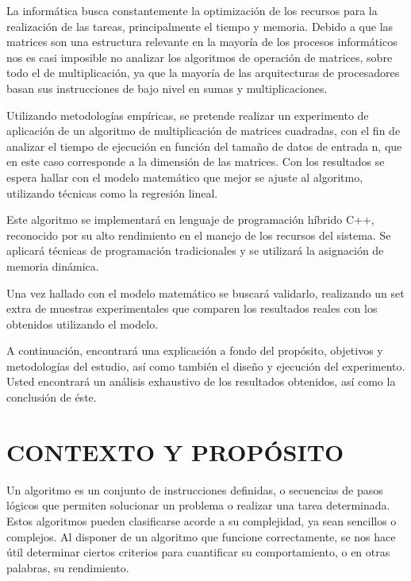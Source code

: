\documentclass[11pt, twocolumn]{llncs}
\begin{document}
La informática busca constantemente la optimización de los recursos para la realización de las tareas, principalmente el tiempo y memoria. Debido a que las matrices son una estructura relevante en la mayoría de los procesos informáticos nos es casi imposible no analizar los algoritmos de operación de matrices, sobre todo el de multiplicación, ya que la mayoría de las arquitecturas de procesadores basan sus instrucciones de bajo nivel en sumas y multiplicaciones. 

Utilizando metodologías empíricas, se pretende realizar un experimento de aplicación de un algoritmo de multiplicación de matrices cuadradas, con el fin de analizar el tiempo de ejecución en función del tamaño de datos de entrada n, que en este caso corresponde a la dimensión de las matrices. Con los resultados se espera hallar con el modelo matemático que mejor se ajuste al algoritmo, utilizando técnicas como la regresión lineal. 

Este algoritmo se implementará en lenguaje de programación híbrido C++, reconocido por su alto rendimiento en el manejo de los recursos del sistema. Se aplicará técnicas de programación tradicionales y se utilizará la asignación de memoria dinámica.

Una vez hallado con el modelo matemático se buscará validarlo, realizando un set extra de muestras experimentales que comparen los resultados reales con los obtenidos utilizando el modelo.

A continuación, encontrará una explicación a fondo del propósito, objetivos y metodologías del estudio, así como también el diseño y ejecución del experimento. Usted encontrará un análisis exhaustivo de los resultados obtenidos, así como la conclusión de éste.


\section{CONTEXTO Y PROPÓSITO}\label{contexto_proposito}

Un algoritmo es un conjunto de instrucciones definidas, o secuencias de pasos lógicos que permiten solucionar un problema o realizar una tarea determinada. Estos algoritmos pueden clasificarse acorde a su complejidad, ya sean sencillos o complejos. Al disponer de un algoritmo que funcione correctamente, se nos hace útil determinar ciertos criterios para cuantificar su comportamiento, o en otras palabras, su rendimiento.
\end{document}
